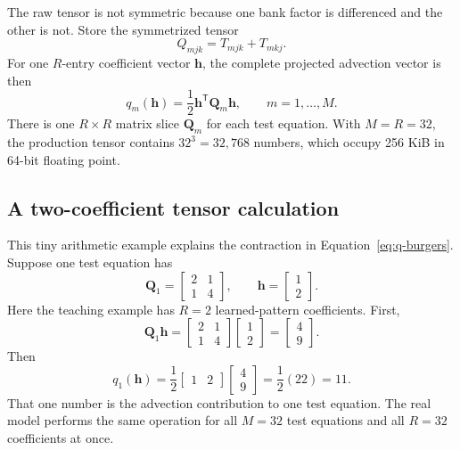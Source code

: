\documentclass[11pt]{article}
\newcommand{\mat}[1]{\mathbf{#1}}
\newcommand{\vect}[1]{\mathbf{#1}}
\begin{document}
The raw tensor is not symmetric because one bank factor is differenced and
the other is not.  Store the symmetrized tensor
\begin{equation}
  Q_{mjk}=T_{mjk}+T_{mkj}.
\end{equation}
For one $R$-entry coefficient vector $\vect{h}$, the complete projected
advection vector is then
\begin{equation}
  q_m(\vect{h})
  =\frac{1}{2}\vect{h}^{\mathsf T}\mat{Q}_m\vect{h},
  \qquad m=1,\ldots,M.
  \label{eq:q-burgers}
\end{equation}
There is one $R\times R$ matrix slice $\mat{Q}_m$ for each test equation.
With $M=R=32$, the production tensor contains $32^3=32{,}768$ numbers, which
occupy 256 KiB in 64-bit floating point.

\subsection{A two-coefficient tensor calculation}

This tiny arithmetic example explains the contraction in
Equation~\eqref{eq:q-burgers}.  Suppose one test equation has
\begin{equation}
  \mat{Q}_1=\begin{bmatrix}2&1\\1&4\end{bmatrix},
  \qquad
  \vect{h}=\begin{bmatrix}1\\2\end{bmatrix}.
\end{equation}
Here the teaching example has $R=2$ learned-pattern coefficients.  First,
\begin{equation}
  \mat{Q}_1\vect{h}
  =\begin{bmatrix}2&1\\1&4\end{bmatrix}
   \begin{bmatrix}1\\2\end{bmatrix}
  =\begin{bmatrix}4\\9\end{bmatrix}.
\end{equation}
Then
\begin{equation}
  q_1(\vect{h})
  =\frac12\begin{bmatrix}1&2\end{bmatrix}
    \begin{bmatrix}4\\9\end{bmatrix}
  =\frac12(22)=11.
\end{equation}
That one number is the advection contribution to one test equation.  The real
model performs the same operation for all $M=32$ test equations and all
$R=32$ coefficients at once.
\end{document}
